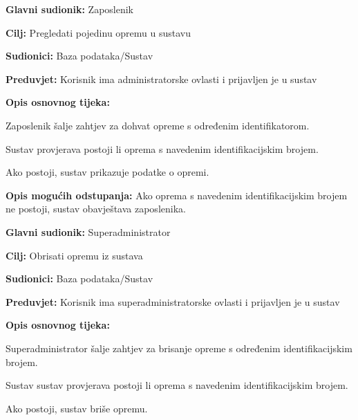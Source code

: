                \noindent {}
					\begin{packed_item}
	
						\item \textbf{Glavni sudionik: }Zaposlenik
						\item  \textbf{Cilj:} Pregledati pojedinu opremu u sustavu
						\item  \textbf{Sudionici:} Baza podataka/Sustav
						\item  \textbf{Preduvjet:} Korisnik ima administratorske ovlasti i prijavljen je u sustav
						\item  \textbf{Opis osnovnog tijeka:}
						
						\item[] \begin{packed_enum}
	
							\item Zaposlenik šalje zahtjev za dohvat opreme s određenim identifikatorom.
							\item Sustav provjerava postoji li oprema s navedenim identifikacijskim brojem.
                            \item Ako postoji, sustav prikazuje podatke o opremi.
	
						\end{packed_enum}
						
						\item  \textbf{Opis mogućih odstupanja:} Ako oprema s navedenim identifikacijskim brojem ne postoji, sustav obavještava zaposlenika.
						
						
					\end{packed_item}

                \noindent {}
					\begin{packed_item}
	
						\item \textbf{Glavni sudionik: }Superadministrator
						\item  \textbf{Cilj:} Obrisati opremu iz sustava
						\item  \textbf{Sudionici:} Baza podataka/Sustav
						\item  \textbf{Preduvjet:} Korisnik ima superadministratorske ovlasti i prijavljen je u sustav
						\item  \textbf{Opis osnovnog tijeka:}
						
						\item[] \begin{packed_enum}
	
							\item Superadministrator šalje zahtjev za brisanje opreme s određenim identifikacijskim brojem.
							\item Sustav sustav provjerava postoji li oprema s navedenim identifikacijskim brojem.
                            \item Ako postoji, sustav briše opremu.
	
						\end{packed_enum}
						
						
					\end{packed_item}

